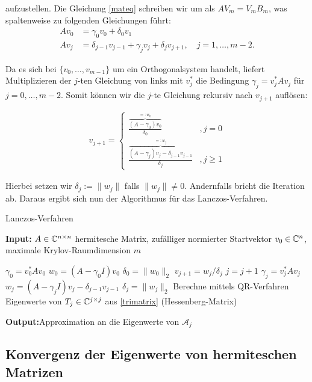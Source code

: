 \documentclass{article}
\theoremstyle{plain}
\begin{document}
aufzustellen. Die Gleichung \eqref{mateq} schreiben wir um als $AV_m = V_m B_m$, was spaltenweise zu folgenden Gleichungen führt:
\begin{align*}
	A v_0 &= \gamma_0 v_0 + \delta_0 v_1 \\
	A v_j &= \delta_{j-1} v_{j-1} + \gamma_j v_j + \delta_j v_{j+1}, \quad j=1, \dots, m-2.
\end{align*}

Da es sich bei $\{v_0, \dots, v_{m-1}\}$ um ein Orthogonalsystem handelt, liefert Multiplizieren der $j$-ten Gleichung von links mit $v_j^*$ die Bedingung $\gamma_j = v_j^*Av_j$ für $j = 0, \dots, m-2$. Somit können wir die $j$-te Gleichung rekursiv nach $v_{j+1}$ auflösen:

\begin{align*}
	v_{j+1} = \begin{cases}
		\frac{\overbrace{(A-\gamma_0)v_0}^{=:w_0}}{\delta_0} &,j = 0 \\
		\frac{\overbrace{(A-\gamma_j)v_j - \delta_{j-1} v_{j-1}}^{=:w_j}}{\delta_j} &,j \geq 1
	\end{cases}
\end{align*}

Hierbei setzen wir $\delta_j := \|w_j\|$ falls $\|w_j\| \neq 0$. Andernfalls bricht die Iteration ab. Daraus ergibt sich nun der Algorithmus für das Lanczos-Verfahren.

\renewcommand{\algorithmicrequire}{\textbf{Input:}}
\renewcommand{\algorithmicensure}{\textbf{Output:}}

\begin{algorithm}
	\label{Lanczos-Verfahren}
	\caption{Lanczos-Verfahren}
	\algorithmicrequire{ $A \in \mathbb{C}^{n\times n}$ hermitesche Matrix, zufälliger normierter Startvektor $v_0 \in \mathbb{C}^n$, maximale Krylov-Raumdimension $m$}
	\begin{algorithmic}[1]
		\State $\gamma_0 = v_0^*Av_0$
		\State $w_0 = (A-\gamma_0 I)v_0$
	  \State $\delta_0 = \|w_0\|_2$
		\State $v_{j+1} = w_j/\delta_j$
		\State $j = j+1$
		\State $\gamma_j = v_j^*Av_j$
		\State $w_j = (A-\gamma_j I)v_j - \delta_{j-1}v_{j-1}$
		\State $\delta_j = \|w_j\|_2$
		\EndWhile
		\State Berechne mittels QR-Verfahren Eigenwerte von $T_j \in \mathbb{C}^{j \times j}$ aus \eqref{trimatrix} (Hessenberg-Matrix)
	\end{algorithmic}
	\algorithmicensure{Approximation an die Eigenwerte von $\mathcal{A}_j$}
\end{algorithm}


\subsection{Konvergenz der Eigenwerte von hermiteschen Matrizen}\label{konvergenz}
\end{document}
